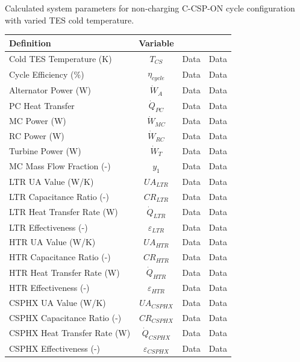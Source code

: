\begin{paracol}{2}
\begin{specialtable}[htbp] 
    \caption{Calculated system parameters for non-charging C-CSP-ON cycle configuration with varied TES cold temperature. \label{tab-c-csp-on}}
    \begin{tabular}{lccc}
    \toprule
    \textbf{Definition} & \textbf{Variable} &  &\\
    \midrule
    Cold TES Temperature (K)	&	$T_{CS}$	&	Data	&	Data	\\
    Cycle Efficiency (\%)	&	$\eta_{cycle}$	&	Data	&	Data	\\
    Alternator Power (W)	&	$\dot{W}_{A}$	&	Data	&	Data	\\
    PC Heat Transfer	&	$\dot{Q}_{PC}$	&	Data	&	Data	\\
    MC Power (W)	&	$\dot{W}_{MC}$	&	Data	&	Data	\\
    RC Power (W)	&	$\dot{W}_{RC}$	&	Data	&	Data	\\
    Turbine Power (W)	&	$\dot{W}_{T}$	&	Data	&	Data	\\
    MC Mass Flow Fraction (-)	&	$y_{1}$	&	Data	&	Data	\\
    LTR UA Value (W/K)	&	$UA_{LTR}$	&	Data	&	Data	\\
    LTR Capacitance Ratio (-)	&	$CR_{LTR}$	&	Data	&	Data	\\
    LTR Heat Transfer Rate (W)	&	$\dot{Q}_{LTR}$	&	Data	&	Data	\\
    LTR Effectiveness (-)	&	$\varepsilon_{LTR}$	&	Data	&	Data	\\
    HTR UA Value (W/K)	&	$UA_{HTR}$	&	Data	&	Data	\\
    HTR Capacitance Ratio (-)	&	$CR_{HTR}$	&	Data	&	Data	\\
    HTR Heat Transfer Rate (W)	&	$\dot{Q}_{HTR}$	&	Data	&	Data	\\
    HTR Effectiveness (-)	&	$\varepsilon_{HTR}$	&	Data	&	Data	\\
    CSPHX UA Value (W/K)	&	$UA_{CSPHX}$	&	Data	&	Data	\\
    CSPHX Capacitance Ratio (-)	&	$CR_{CSPHX}$	&	Data	&	Data	\\
    CSPHX Heat Transfer Rate (W)	&	$\dot{Q}_{CSPHX}$	&	Data	&	Data	\\
    CSPHX Effectiveness (-)	&	$\varepsilon_{CSPHX}$	&	Data	&	Data	\\
    \bottomrule
    \end{tabular}\\
\end{specialtable}


\end{paracol}
